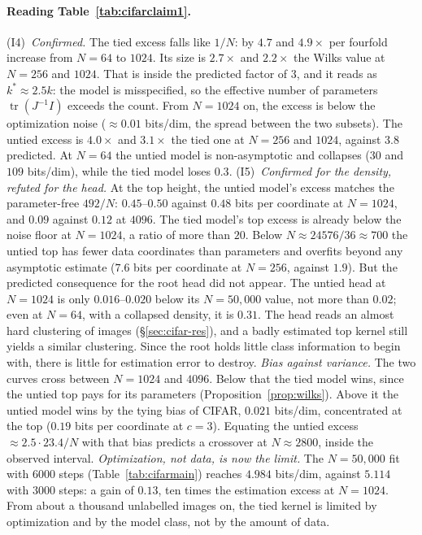 \documentclass[11pt]{article}
\theoremstyle{definition}
\begin{document}
\paragraph{Reading Table~\ref{tab:cifarclaim1}.}
(I4)~\emph{Confirmed.} The tied excess falls like $1/N$: by $4.7$ and $4.9\times$ per fourfold increase from $N=64$
to $1024$. Its size is $2.7\times$ and $2.2\times$ the Wilks value at $N=256$ and $1024$. That is inside the predicted factor
of $3$, and it reads as $k^*\approx2.5k$: the model is misspecified, so the effective number of parameters
$\operatorname{tr}(J^{-1}I)$ exceeds the count. From $N=1024$ on, the excess is below the optimization noise
($\approx0.01$ bits/dim, the spread between the two subsets). The untied excess is $4.0\times$ and $3.1\times$ the tied
one at $N=256$ and $1024$, against $3.8$ predicted. At $N=64$ the untied model is non-asymptotic and collapses
($30$ and $109$ bits/dim), while the tied model loses $0.3$.
(I5)~\emph{Confirmed for the density, refuted for the head.} At the top height, the untied model's excess matches
the parameter-free $492/N$: $0.45$--$0.50$ against $0.48$ bits per coordinate at $N=1024$, and $0.09$ against $0.12$ at
$4096$. The tied model's top excess is already below the noise floor at $N=1024$, a ratio of more than $20$.
Below $N\approx24576/36\approx700$ the untied top has fewer data coordinates than parameters and overfits beyond any
asymptotic estimate ($7.6$ bits per coordinate at $N=256$, against $1.9$). But the predicted consequence for the
root head did not appear. The untied head at $N=1024$ is only $0.016$--$0.020$ below its $N=50{,}000$ value, not more
than $0.02$; even at $N=64$, with a collapsed density, it is $0.31$. The head reads an almost hard clustering of
images (\S\ref{sec:cifar-res}), and a badly estimated top kernel still yields a similar clustering. Since the root
holds little class information to begin with, there is little for estimation error to destroy.
\emph{Bias against variance.} The two curves cross between $N=1024$ and $4096$. Below that the tied model wins,
since the untied top pays for its parameters (Proposition~\ref{prop:wilks}). Above it the untied model wins by the
tying bias of CIFAR, $0.021$ bits/dim, concentrated at the top ($0.19$ bits per coordinate at $c=3$). Equating the
untied excess $\approx2.5\cdot23.4/N$ with that bias predicts a crossover at $N\approx2800$, inside the observed interval.
\emph{Optimization, not data, is now the limit.} The $N=50{,}000$ fit with $6000$ steps (Table~\ref{tab:cifarmain})
reaches $4.984$ bits/dim, against $5.114$ with $3000$ steps: a gain of $0.13$, ten times the estimation excess at
$N=1024$. From about a thousand unlabelled images on, the tied kernel is limited by optimization and by the model
class, not by the amount of data.
\end{document}
